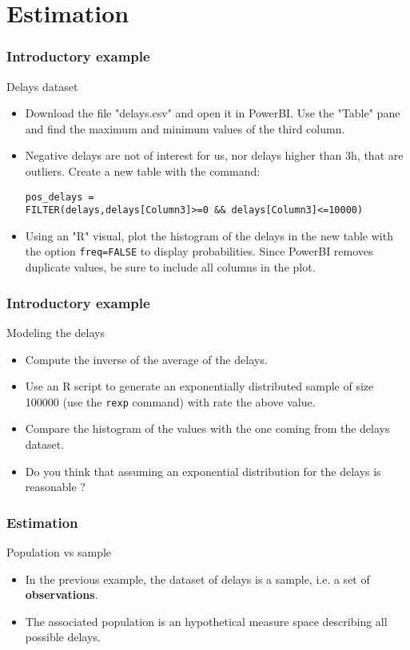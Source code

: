 \documentclass[main.tex]{subfiles}
\begin{document}
\section{Estimation}
\begin{frame}[fragile]
    \frametitle{Introductory example}
\begin{block}{Delays dataset}
   \begin{itemize}
    \item<+-> Download the file "delays.csv" and open it in PowerBI. Use the "Table" pane and find the maximum and minimum values of the
    third column. 
    \item<+-> Negative delays are not of interest for us, nor delays higher than 3h, that are outliers. Create a new table with the command:
    {\footnotesize 
    \begin{verbatim}
pos_delays = 
FILTER(delays,delays[Column3]>=0 && delays[Column3]<=10000)
    \end{verbatim}}
    \item<+-> Using an "R" visual, plot the histogram of the delays in the new table with the option \texttt{freq=FALSE} to display probabilities.
    Since PowerBI removes duplicate values, be sure to include all columns in the plot.
\end{itemize}
\end{block}
\end{frame}
\begin{frame}
    \frametitle{Introductory example}
\begin{block}{Modeling the delays}
   \begin{itemize}
    \item<+-> Compute the inverse of the average of the delays.
    \item<+-> Use an R script to generate an exponentially distributed sample of size 100000 (use the \texttt{rexp} command) with rate the above value.
    \item<+-> Compare the histogram of the values with the one coming from the delays dataset. 
    \item<+-> Do you think that assuming an exponential distribution for the delays is reasonable ?
   \end{itemize} 
\end{block}
\end{frame}
\begin{frame}
    \frametitle{Estimation}
\begin{block}{Population vs sample}
    \begin{itemize}
        \item<+-> In the previous example, the dataset of delays is a sample, i.e. a set of \textbf{observations}.
        \item<+-> The associated population is an hypothetical measure space describing all possible delays.
    \end{itemize}
\end{block}
\end{frame}
\end{document}
